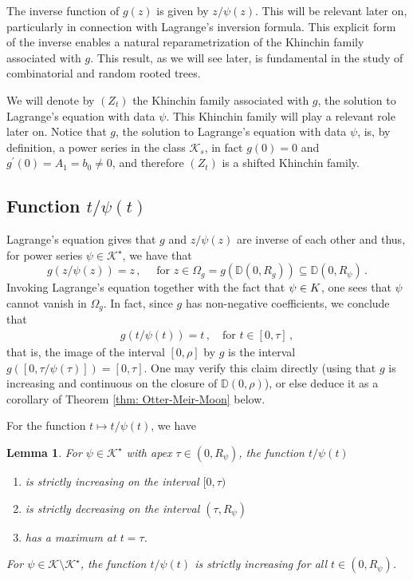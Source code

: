 \documentclass[11pt,a4paper,leqno]{amsart}
\theoremstyle{plain}
\newtheorem{lem}[theo]{Lemma}
\theoremstyle{definition}
\numberwithin{equation}{section}
\def\D{\mathbb{D}}
\def\K{\mathcal{K}}
\begin{document}
	
	
	The inverse function of \( g(z) \) is given by \( z/\psi(z) \). This will be relevant later on, particularly in connection with Lagrange's inversion formula. This explicit form of the inverse enables a natural reparametrization of the Khinchin family associated with \( g \). This result, as we will see later, is fundamental in the study of combinatorial and random rooted trees.
	\smallskip
	
	We will denote by \( (Z_t) \) the Khinchin family associated with \( g \), the solution to Lagrange's equation with data \( \psi \). This Khinchin family will play a relevant role later on. Notice that $g$, the solution to Lagrange's equation with data $\psi$, is, by definition, a power series in the class $\K_s$, in fact $g(0) = 0$ and $g^{\prime}(0) = A_1 =b_0 \neq 0$, and therefore $(Z_t)$ is a shifted Khinchin family. 
	
	
	
	\subsection{Function $t/\psi(t)$}
	
	Lagrange's equation gives that $g$ and $z/\psi(z)$ are inverse of each other and thus, for power series $\psi \in \K^{\star}$, we have that
	$$g(z/\psi(z))=z\, , \quad \mbox{ for } z \in \Omega_g = g(\D(0,R_g)) \subseteq \D(0,R_{\psi})\,.$$
Invoking Lagrange’s equation together with the fact that $\psi\in\mathcal \K$, one sees that $\psi$ cannot vanish in $\Omega_g$.
	In fact, since $g$ has non-negative coefficients, we conclude that
	\begin{align*}
	g(t/\psi(t))=t\, , \quad \mbox{for $t \in[0, \tau]$}\,,
	\end{align*}
	that is, the image of the interval $[0,\rho]$ by $g$ is the interval $g([0,\tau/\psi(\tau)]) = [0,\tau]$. One may verify this claim directly (using that $g$ is increasing and continuous on the closure of $\D(0,\rho)$), or else deduce it as a corollary of Theorem \ref{thm: Otter-Meir-Moon} below.
	\medskip
	
	For the function $t \mapsto t/\psi(t)$, we have
	\begin{lem}\label{lemma: monotony_t/psi(t)} For  $\psi \in \K^\star$ with apex $\tau \in (0,R_\psi)$, the function $t/\psi(t)$
		\begin{enumerate}
			\item is strictly increasing on the interval $[0,\tau)$
			\item is strictly decreasing on the interval $(\tau,R_{\psi})$
			\item has a maximum at $t = \tau$.
		\end{enumerate}
		For \(\psi\in\mathcal K\setminus\mathcal K^\star\), the function \(t/\psi(t)\) is strictly increasing for all \(t\in(0,R_\psi)\).
	\end{lem}
	
\end{document}
